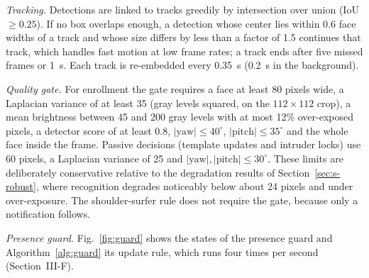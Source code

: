 \documentclass[journal]{IEEEtran}
\begin{document}
\emph{Tracking.} Detections are linked to tracks greedily by intersection over union (IoU $\ge0.25$). If no box overlaps enough, a detection whose center lies within 0.6 face widths of a track and whose size differs by less than a factor of 1.5 continues that track, which handles fast motion at low frame rates; a track ends after five missed frames or 1~s. Each track is re-embedded every 0.35~s (0.2~s in the background).

\emph{Quality gate.} For enrollment the gate requires a face at least 80 pixels wide, a Laplacian variance of at least 35 (gray levels squared, on the $112\times112$ crop), a mean brightness between 45 and 200 gray levels with at most 12\% over-exposed pixels, a detector score of at least 0.8, $|\text{yaw}|\le40^\circ$, $|\text{pitch}|\le35^\circ$ and the whole face inside the frame. Passive decisions (template updates and intruder locks) use 60 pixels, a Laplacian variance of 25 and $|\text{yaw}|,|\text{pitch}|\le30^\circ$. These limits are deliberately conservative relative to the degradation results of Section~\ref{sec:s-robust}, where recognition degrades noticeably below about 24 pixels and under over-exposure. The shoulder-surfer rule does not require the gate, because only a notification follows.

\emph{Presence guard.} Fig.~\ref{fig:guard} shows the states of the presence guard and Algorithm~\ref{alg:guard} its update rule, which runs four times per second (Section~III-F).
\end{document}
